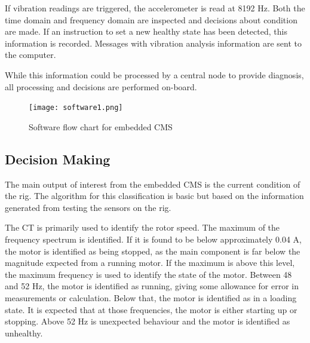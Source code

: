 If vibration readings are triggered, the accelerometer is read at 8192 Hz.
Both the time domain and frequency domain are inspected and decisions about condition are made.
If an instruction to set a new healthy state has been detected, this information is recorded.
Messages with vibration analysis information are sent to the computer.
\par

While this information could be processed by a central node to provide diagnosis, all processing and decisions are performed on-board.


\begin{figure}
    \centering
    \texttt{[image: software1.png]}
    \caption{Software flow chart for embedded CMS}
    \label{fig:SW_Flowchart}
\end{figure}

\subsection{Decision Making}

The main output of interest from the embedded CMS is the current condition of the rig.
The algorithm for this classification is basic but based on the information generated from testing the sensors on the rig.
\par

The CT is primarily used to identify the rotor speed.
The maximum of the frequency spectrum is identified.
If it is found to be below approximately 0.04 A, the motor is identified as being stopped, as the main component is far below the magnitude expected from a running motor.
If the maximum is above this level, the maximum frequency is used to identify the state of the motor.
Between 48 and 52 Hz, the motor is identified as running, giving some allowance for error in measurements or calculation.
Below that, the motor is identified as in a loading state.
It is expected that at those frequencies, the motor is either starting up or stopping.
Above 52 Hz is unexpected behaviour and the motor is identified as unhealthy.
\par

